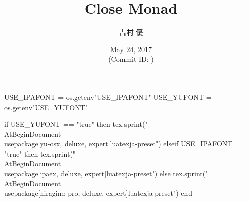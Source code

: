 \hypersetup{colorlinks,linkcolor=,urlcolor=links}

\beamertemplatenavigationsymbolsempty


\usepackage{luacode}
\usepackage{luatexja}
\usepackage{pgfpages}

\begin{luacode*}
  USE_IPAFONT = os.getenv"USE_IPAFONT"
  USE_YUFONT = os.getenv"USE_YUFONT"
  
  if USE_YUFONT == "true" then
    tex.sprint("\\AtBeginDocument{\\usepackage[yu-osx, deluxe, expert]{luatexja-preset}}")
  elseif USE_IPAFONT == "true" then
    tex.sprint("\\AtBeginDocument{\\usepackage[ipaex, deluxe, expert]{luatexja-preset}}")
  else
    tex.sprint("\\AtBeginDocument{\\usepackage[hiragino-pro, deluxe, expert]{luatexja-preset}}")
  end
\end{luacode*}

\usepackage{epigraph}
\usepackage{etoolbox}
\usepackage{tikz}
\usepackage{framed}
\usepackage{libertine}
\usepackage{amsmath}
\usepackage{mathtools}
\usepackage{listings}

\renewcommand{\kanjifamilydefault}{\gtdefault}


\setmainfont[Ligatures=TeX]{Linux Libertine O}
\setsansfont[Ligatures=TeX]{CMU Sans Serif}
\setmonofont[Ligatures=TeX]{CMU Typewriter Text}



\title[Close Monad]{%
  Close Monad
}
\author{吉村 優}
\date[May 24, 2017]{%
  May 24, 2017 \\%
  {\footnotesize (Commit ID: \GITAbrHash)}
}






\newcommand\ballref[1]{%
\tikz \node[circle, shade,ball color=structure.fg,inner sep=0pt,%
  text width=8pt,font=\tiny,align=center] {\color{white}\ref{#1}};
}



